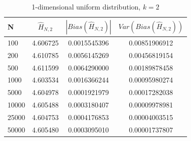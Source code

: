 \documentclass{article}
\begin{document}
\begin{table}
\caption{1-dimensional uniform distribution, $k=2$} \label{uniform_k=2_table}
\begin{center}
\begin{tabular}{| l | c c c|} 
\toprule
N & $\hat{H}_{N, 2}$ & $|Bias(\hat{H}_{N, 2})|$ & $Var(Bias(\hat{H}_{N, 2}))$ \\
\midrule[1pt]
100     & 4.606725     & 0.0015545396     & 0.00851906912  \\
200     & 4.610785     & 0.0056145269     & 0.00456819154  \\
500     & 4.611599     & 0.0064290000     & 0.00189878458  \\
1000    & 4.603534     & 0.0016366244     & 0.00095980274  \\
5000    & 4.604978     & 0.0001921979     & 0.00017282038  \\
10000   & 4.605488     & 0.0003180407     & 0.00009978981  \\
25000   & 4.604753     & 0.0004176853     & 0.00004003515  \\
50000   & 4.605480     & 0.0003095010     & 0.00001737807  \\
\hline
\end{tabular}
\end{center}
\end{table}
\end{document}
